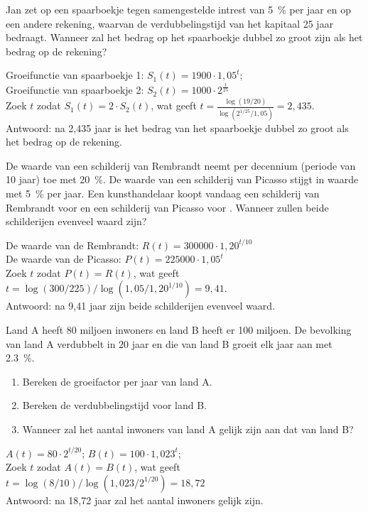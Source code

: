 \begin{oef}
  Jan zet  op een spaarboekje tegen samengestelde
      intrest van \SI{5}{\percent} per jaar en  op een andere rekening,
      waarvan de verdubbelingstijd van het kapitaal 25 jaar bedraagt.
      Wanneer zal het bedrag op het spaarboekje dubbel zo
      groot zijn als het bedrag op de rekening?
\begin{opl}
Groeifunctie van spaarboekje 1: $S_1(t)=1900\cdot 1,05^t$; \\Groeifunctie van spaarboekje 2: $S_2(t)=1000\cdot 2^\frac{t}{25}$\\
Zoek $t$ zodat $S_1(t)=2\cdot S_2(t)$, wat geeft $t=\frac{\log(19/20)}{\log(2^{1/25}/1,05)}=2,435$.\\
Antwoord: na 2,435 jaar is het bedrag van het spaarboekje dubbel zo groot als het bedrag op de rekening.
\end{opl}
\end{oef}



\begin{oef}
  De waarde van een schilderij van Rembrandt neemt per
      decennium (periode van 10 jaar) toe met \SI{20}{\percent}. De waarde van een schilderij
      van Picasso stijgt in waarde met \SI{5}{\percent}  per jaar. Een
      kunsthandelaar koopt vandaag een schilderij van Rembrandt voor
       en een schilderij van Picasso voor
      .
      Wanneer zullen beide schilderijen evenveel waard zijn?
      \begin{opl}
         De waarde van de Rembrandt: $R(t)=300000\cdot 1,20^{t/10}$\\
         De waarde van de Picasso: $P(t)=225000\cdot 1,05^t$\\
         Zoek $t$ zodat $P(t)=R(t)$, wat geeft $t=\log(300/225)/\log(1,05/1,20^{1/10})=9,41$.\\
         Antwoord: na 9,41 jaar zijn beide schilderijen evenveel waard.
      \end{opl}
\end{oef}

\begin{oef}
 Land A heeft 80 miljoen inwoners en land B heeft er 100
      miljoen. De bevolking van land A verdubbelt in 20 jaar en die
      van land B groeit elk jaar aan met \SI{2,3}{\percent}.
      \begin{enumerate}
          \item  Bereken de groeifactor per jaar van land A.
      \item Bereken de verdubbelingstijd voor land B.
          \item Wanneer zal het aantal inwoners van land A gelijk zijn
            aan dat van land B?
      \end{enumerate}
      \begin{opl}
	$A(t)=80\cdot 2^{t/20}$; $B(t)=100\cdot 1,023^t$;\\
	Zoek $t$ zodat $A(t)=B(t)$, wat geeft $t=\log(8/10)/\log(1,023/2^{1/20})=18,72$\\
	Antwoord: na 18,72 jaar zal het aantal inwoners gelijk zijn.
      \end{opl}
\end{oef}

